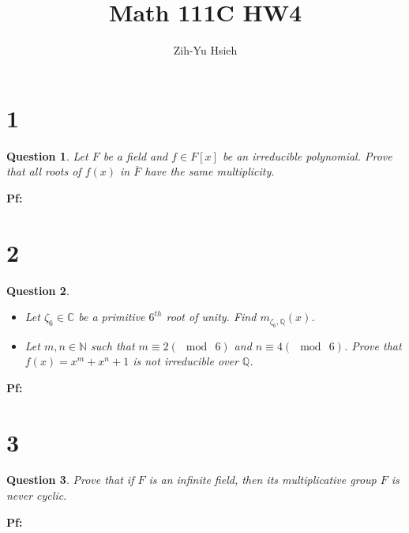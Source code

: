 \documentclass{article}
\title{Math 111C HW4}
\author{Zih-Yu Hsieh}
\newtheorem{question}{Question}
\begin{document}
\maketitle

\section*{1}
\begin{myBox}[]{}
    \begin{question}
        Let $F$ be a field and $f\in F[x]$ be an irreducible polynomial. Prove that all roots of $f(x)$ in $\overline{F}$ have the same multiplicity.
    \end{question}
\end{myBox}

\textbf{Pf:}

\break

\section*{2}
\begin{myBox}[]{}
    \begin{question}
        \begin{itemize}
            \item[(a)] Let $\zeta_6\in\mathbb{C}$ be a primitive $6^{th}$ root of unity. Find $m_{\zeta_6,\mathbb{Q}}(x)$.
            \item[(b)] Let $m,n\in\mathbb{N}$ such that $m\equiv 2(\mod\ 6)$ and $n\equiv 4(\mod\ 6)$. Prove that $f(x)=x^m+x^n+1$ is not irreducible over $\mathbb{Q}$. 
        \end{itemize}
    \end{question}
\end{myBox}

\textbf{Pf:}

\break

\section*{3}
\begin{myBox}[]{}
    \begin{question}
        Prove that if $F$ is an infinite field, then its multiplicative group $F$ is never cyclic.
    \end{question}
\end{myBox}

\textbf{Pf:}

\break
\end{document}
